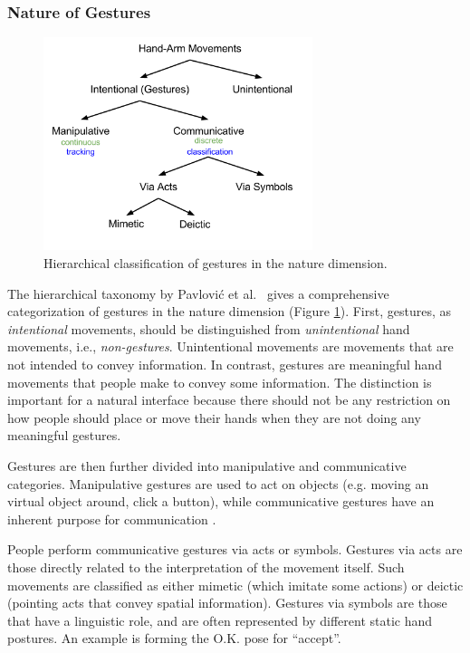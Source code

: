 \subsubsection{Nature of Gestures}
\begin{figure}[tbh]
  \centering
  \includegraphics[width=0.7\textwidth]{figures/taxonomy.png} 
  \caption{Hierarchical classification of gestures in the nature dimension.}
  \label{fig:taxonomy}
\end{figure}

The hierarchical taxonomy by Pavlovi\'{c} et al.~\cite{Pavlovic97} gives
a comprehensive categorization of gestures in the nature dimension (Figure
\ref{fig:taxonomy}).
First, gestures, as \textit{intentional} movements, should be distinguished from \textit{unintentional} hand movements, i.e., \textit{non-gestures}.
Unintentional movements are movements that are not intended to convey
information. In contrast, gestures are meaningful hand movements that people make to convey some
information. The distinction is important for a natural interface because there
should not be any restriction on how people should place or move their hands
when they are not doing any meaningful gestures.  


Gestures are then further divided into manipulative and communicative
categories. Manipulative gestures are used to act on objects (e.g.
moving an virtual object around, click a button), while
communicative gestures have an inherent purpose for communication \cite{Pavlovic97}. 

People perform communicative gestures via acts or symbols. Gestures via acts are
those directly related to the interpretation of the movement itself. Such
movements are classified as either mimetic (which imitate some actions) or
deictic (pointing acts that convey spatial information). Gestures via symbols
are those that have a linguistic role, and are often represented by different static hand postures. An example is forming the
O.K. pose for ``accept''. 

